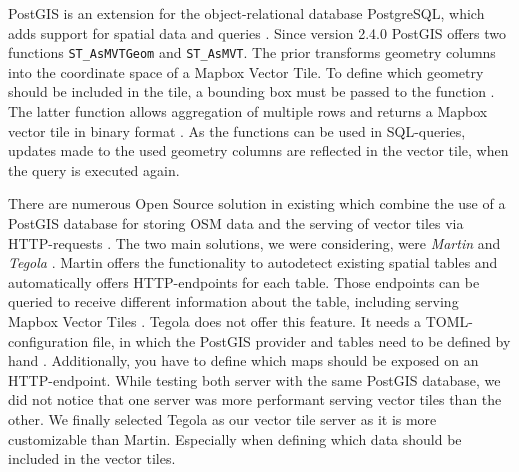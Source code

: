 \documentclass[conference]{IEEEtran}
\begin{document}
PostGIS is an extension for the object-relational database PostgreSQL, which adds support for spatial data and queries \cite{noauthor_postgis_nodate}. Since version 2.4.0 PostGIS offers two functions \texttt{ST\_AsMVTGeom} and \texttt{ST\_AsMVT}. The prior transforms geometry columns into the coordinate space of a Mapbox Vector Tile. To define which geometry should be included in the tile, a bounding box must be passed to the function \cite{noauthor_st_asmvtgeom_nodate}. The latter function allows aggregation of multiple rows and returns a Mapbox vector tile in binary format \cite{noauthor_st_asmvt_nodate}. As the functions can be used in SQL-queries, updates made to the used geometry columns are reflected in the vector tile, when the query is executed again.

There are numerous Open Source solution in existing which combine the use of a PostGIS database for storing OSM data and the serving of vector tiles via HTTP-requests \cite{noauthor_awesome-vector-tiles_2022}. The two main solutions, we were considering, were \textit{Martin} \cite{noauthor_martin_2022} and \textit{Tegola} \cite{noauthor_tegola_2022}. Martin offers the functionality to autodetect existing spatial tables and automatically offers HTTP-endpoints for each table. Those endpoints can be queried to receive different information about the table, including serving Mapbox Vector Tiles \cite{noauthor_martin_2022}. Tegola does not offer this feature. It needs a TOML-configuration file, in which the PostGIS provider and tables need to be defined by hand \cite{noauthor_tegola_2022}. Additionally, you have to define which maps should be exposed on an HTTP-endpoint. While testing both server with the same PostGIS database, we did not notice that one server was more performant serving vector tiles than the other. We finally selected Tegola as our vector tile server as it is more customizable than Martin. Especially when defining which data should be included in the vector tiles.
\end{document}
